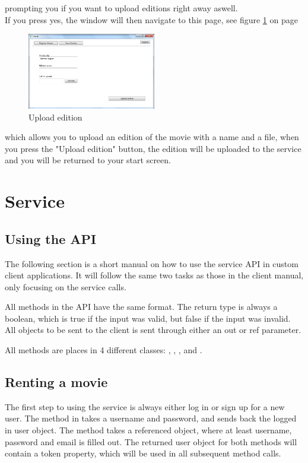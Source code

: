  prompting you if you want to upload editions right away aswell.
\\If you press yes, the window will then navigate to this page, see figure \ref{fig:Manual_Client_Navigation_Upload_Edition} on page \pageref{fig:Manual_Client_Navigation_Upload_Edition}


\begin{figure}[h!]  
  \centering
\includegraphics[width=0.5\textwidth]{Parts/Images/Manual/CPUploadEdition}
\caption{Upload edition}
\label{fig:Manual_Client_Navigation_Upload_Edition}
\end{figure}
 
which allows you to upload an edition of the movie with a name and a file, when you press the "Upload edition" button, the edition will be uploaded to the service and you will be returned to your start screen.

\section{Service}
\label{Manual_Service}

\subsection{Using the API}
\label{Manual_Service_Usage}
The following section is a short manual on how to use the service API in custom client applications. It will follow the same two tasks as those in the client manual, only focusing on the service calls.

All methods in the API have the same format. The return type is always a boolean, which is true if the input was valid, but false if the input was invalid. All objects to be sent to the client is sent through either an out or ref parameter.

All methods are places in 4 different classes: , , , and .

\subsection{Renting a movie}
\label{Manual_Service_Usage_Rent}
The first step to using the service is always either log in or sign up for a new user. The  method in  takes a username and password, and sends back the logged in user object. The  method takes a referenced  object, where at least username, password and email is filled out. The returned user object for both methods will contain a token property, which will be used in all subsequent method calls.

